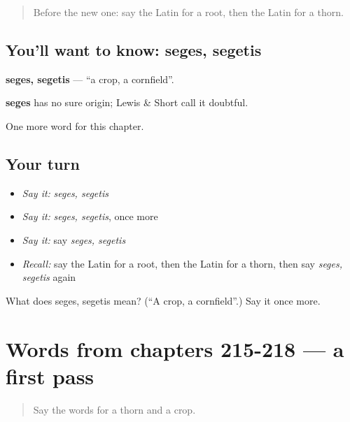 \label{lesson:LA-C223-seges}



\begin{quote}
Before the new one: say the Latin for a root, then the Latin for a thorn.
\end{quote}

\subsection*{You'll want to know: seges, segetis}
\textbf{seges, segetis} — \textquotedblleft{}a crop, a cornfield\textquotedblright{}.

\begin{cousinweb}
\textbf{seges} has no sure origin; Lewis \& Short call it doubtful.
\end{cousinweb}

\begin{grammarlens}[title={What you've built}]
One more word for this chapter.
\end{grammarlens}

\subsection*{Your turn}
\begin{itemize}
\raggedright
  \item \emph{Say it:} \emph{seges, segetis}
  \item \emph{Say it:} \emph{seges, segetis}, once more
  \item \emph{Say it:} say \emph{seges, segetis}
  \item \emph{Recall:} say the Latin for a root, then the Latin for a thorn, then say \emph{seges, segetis} again
\end{itemize}

\begin{tcolorbox}[breakable,colback=teal!4,colframe=teal!35!black,title={Before you move on}]
What does seges, segetis mean? (\textquotedblleft{}A crop, a cornfield\textquotedblright{}.) Say it once more.
\end{tcolorbox}
\section[(dialogue)]{Words from chapters 215-218 — a first pass}

\label{lesson:LA-R223-first-pass-words-from-chapters-215-218}



\begin{quote}
Say the words for a thorn and a crop.
\end{quote}

